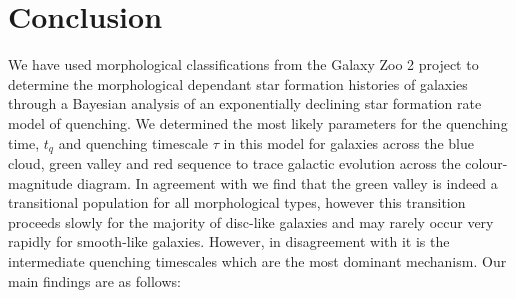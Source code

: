 \documentclass[useAMS,usenatbib]{mn2e}
\begin{document}
\section{Conclusion}\label{conc}
We have used morphological classifications from the Galaxy Zoo 2 project to determine the morphological dependant star formation histories of galaxies through a Bayesian analysis of an exponentially declining star formation rate model of quenching. We determined the most likely parameters for the quenching time, $t_q$ and quenching timescale $\tau$ in this model for galaxies across the blue cloud, green valley and red sequence to trace galactic evolution across the colour-magnitude diagram. In agreement with \citet{Sch2014} we find that the green valley is indeed a transitional population for all morphological types, however this transition proceeds slowly for the majority of disc-like galaxies and may rarely occur very rapidly for smooth-like galaxies. However, in disagreement with \citet{Sch2014} it is the intermediate quenching timescales which are the most dominant mechanism. Our main findings are as follows:
\end{document}

